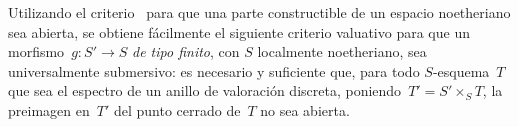 \begin{remarque}
\label{IX.2.6}
Utilizando el criterio~ para que una parte constructible de un
espacio noetheriano sea abierta, se obtiene fácilmente el siguiente criterio
valuativo para que un morfismo~$g\colon S'\to S$ \emph{de tipo finito}, con
$S$ localmente noetheriano, sea universalmente submersivo: es necesario y
suficiente que, para todo $S$-esquema~$T$ que sea el espectro de un anillo de
valoración discreta, poniendo~$T'=S'\times_S T$, la preimagen en~$T'$ del
punto cerrado de~$T$ no sea abierta.
\end{remarque}
